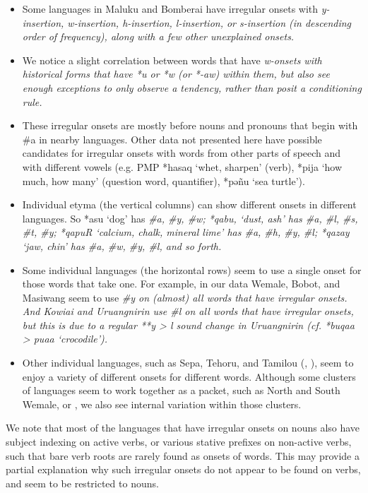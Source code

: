 \begin{itemize}
		\item	Some languages in Maluku
					and Bomberai have irregular onsets with \it{y}-insertion,
					\it{w}-insertion, \it{h}-insertion, \it{l}-insertion, or \it{s}-insertion
					(in descending order of frequency),
					along with a few other unexplained onsets.
		\item	We notice a slight correlation between words that have
					\it{w}-onsets with historical forms that have *u or *w (or *-aw)
					within them, but also see enough exceptions to only observe a tendency,
					rather than posit a conditioning rule.
		\item	These irregular onsets are mostly before nouns
					and pronouns that begin with {\#}a in nearby languages.
					Other data not presented here have possible candidates for irregular
					onsets with words from other parts of speech
					and with different vowels (e.g.
					PMP *hasaq ‘whet, sharpen’ (verb),
					*pija ‘how much, how many’ (question word,
					quantifier), *pəñu ‘sea turtle’).
		\item	Individual etyma (the vertical columns) can show different
					onsets in different languages.
					So *asu ‘dog’ has \it{{\#}a, {\#}y, {\#}w};
					*qabu, ‘dust,
					ash’ has \it{{\#}a, {\#}l, {\#}s, {\#}t, {\#}y};
					*qapuR ‘calcium, chalk,
					mineral lime’ has \it{{\#}a, {\#}h, {\#}y, {\#}l};
					*qazay ‘jaw, chin’ has
					\it{{\#}a, {\#}w, {\#}y, {\#}l}, and so forth.
		\item	Some individual languages (the horizontal rows) seem to
					use a single onset for those words that take one.
					For example, in our data Wemale,
					Bobot, and Masiwang seem to use \it{{\#}y} on (almost) all words
					that have irregular onsets.
					And Kowiai and Uruangnirin use \it{{\#}l} on all words that have
					irregular onsets, but this is due to a regular **y > \it{l}
					sound change in Uruangnirin (cf.
					*buqaa > \it{puaa} ‘crocodile’).
		\item	Other individual languages,
					such as Sepa, Tehoru,
					and Tamilou (,
					), seem to enjoy a variety of different onsets for different words.
					Although some clusters of languages seem to work together as
					a packet, such as North and South Wemale, or ,
					we also see internal variation within those clusters.
\end{itemize}

We note that most of the languages that have irregular onsets
on nouns also have subject indexing on active verbs,
or various stative prefixes on non-active verbs,
such that bare verb roots are rarely found as onsets of words.
This may provide a partial explanation why such irregular onsets
do not appear to be found on verbs,
and seem to be restricted to nouns.

